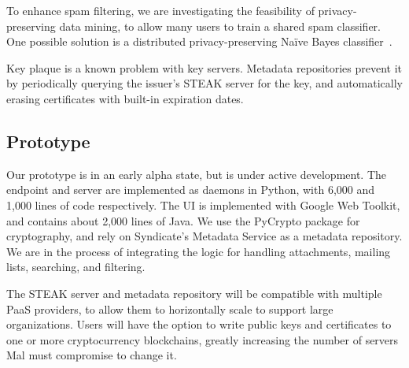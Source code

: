 To enhance spam filtering, we are investigating the feasibility of privacy-preserving data mining, to allow many users to train a shared spam classifier.  One possible solution is a distributed privacy-preserving Na\"{i}ve Bayes classifier~\cite{privacy-preserving-naive-bayes}.

Key plaque is a known problem with key servers.  Metadata repositories prevent it by periodically querying the issuer's STEAK server for the key, and automatically erasing certificates with built-in expiration dates.

\subsection{Prototype}
Our prototype is in an early alpha state, but is under active development.  The endpoint and server are implemented as daemons in Python, with 6,000 and 1,000 lines of code respectively.  The UI is implemented with Google Web Toolkit, and contains about 2,000 lines of Java. We use the PyCrypto package for cryptography, and rely on Syndicate's Metadata Service as a metadata repository.  We are in the process of integrating the logic for handling attachments, mailing lists, searching, and filtering.

The STEAK server and metadata repository will be compatible with multiple PaaS providers, to allow them to horizontally scale to support large organizations.  Users will have the option to write public keys and certificates to one or more cryptocurrency blockchains, greatly increasing the number of servers Mal must compromise to change it.
